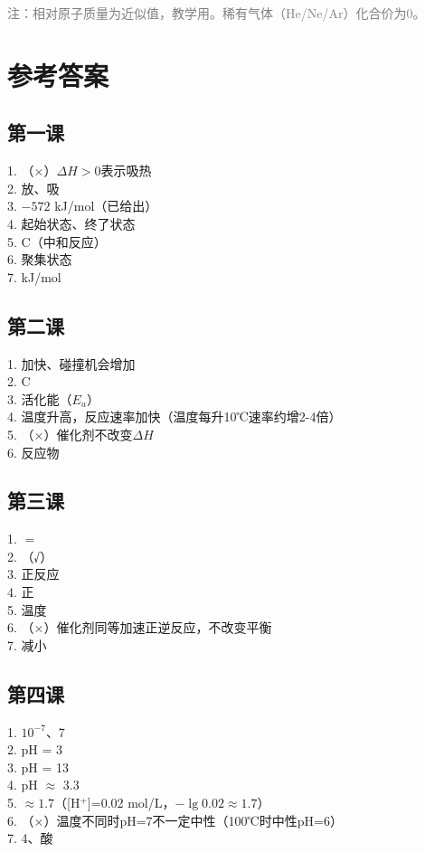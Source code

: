 \documentclass[a4paper,12pt]{ctexart}
\begin{document}
\vspace{0.3cm}
\textcolor{gray}{\small 注：相对原子质量为近似值，教学用。稀有气体（He/Ne/Ar）化合价为0。}

\newpage
\section*{\textcolor{defblue}{参考答案}}

\subsection*{第一课}
1. （×）$\Delta H > 0$表示吸热\\
2. 放、吸\\
3. $-572$ kJ/mol（已给出）\\
4. 起始状态、终了状态\\
5. C（中和反应）\\
6. 聚集状态\\
7. kJ/mol

\subsection*{第二课}
1. 加快、碰撞机会增加\\
2. C\\
3. 活化能（$E_a$）\\
4. 温度升高，反应速率加快（温度每升10℃速率约增2-4倍）\\
5. （×）催化剂不改变$\Delta H$\\
6. 反应物

\subsection*{第三课}
1. $=$\\
2. （√）\\
3. 正反应\\
4. 正\\
5. 温度\\
6. （×）催化剂同等加速正逆反应，不改变平衡\\
7. 减小

\subsection*{第四课}
1. $10^{-7}$、7\\
2. pH = 3\\
3. pH = 13\\
4. pH $\approx$ 3.3\\
5. $\approx1.7$（[H$^+$]=0.02 mol/L，$-\lg0.02\approx1.7$）\\
6. （×）温度不同时pH=7不一定中性（100℃时中性pH=6）\\
7. 4、酸
\end{document}
